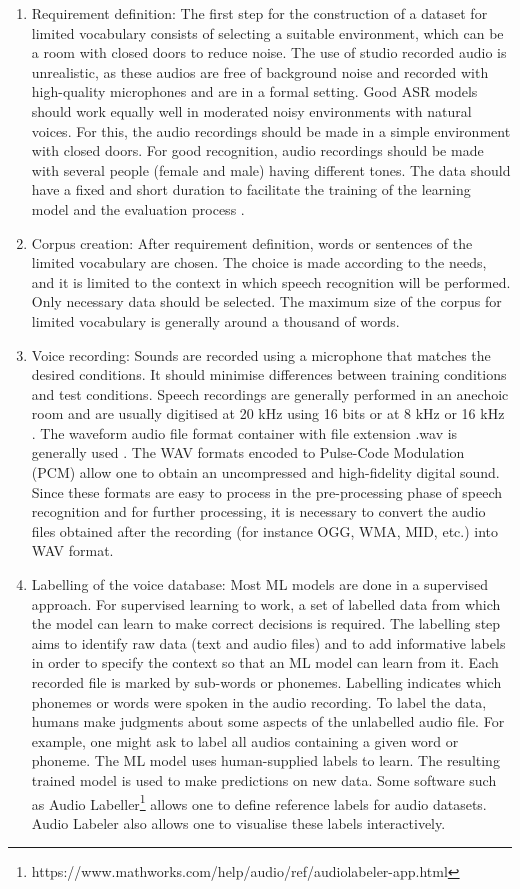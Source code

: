 \begin{enumerate}[label=\alph*.)]
  \item Requirement definition:
The first step for the construction of a dataset for limited vocabulary consists of selecting a suitable environment, which can be a room with closed doors to reduce noise. The use of studio recorded audio is unrealistic, as these audios are free of background noise and recorded with high-quality microphones and are in a formal setting. Good ASR models should work equally well in moderated noisy environments with natural voices. For this, the audio recordings should be made in a simple environment with closed doors.
	For good recognition, audio recordings should be made with several people (female and male) having different tones. The data should have a fixed and short duration to facilitate the training of the learning model and the evaluation process .
\item Corpus creation: 
After requirement definition, words or sentences of the limited vocabulary are chosen. The choice is made according to the needs, and it is limited to the context in which speech recognition will be performed. Only necessary data should be selected. The maximum size of the corpus for limited vocabulary is generally around a thousand of words.
\item Voice recording:
Sounds are recorded using a microphone that matches the desired conditions. It should minimise differences between training conditions and test conditions. Speech recordings are generally performed in an anechoic room and are usually digitised at 20 kHz using 16 bits  or at 8 kHz  or 16 kHz . The waveform audio file format container with file extension .wav is generally used . The WAV formats encoded to Pulse-Code Modulation (PCM) allow one to obtain an uncompressed and high-fidelity digital sound. Since these formats are easy to process in the pre-processing phase of speech recognition and for further processing, it is necessary to convert the audio files obtained after the recording (for instance OGG, WMA, MID, etc.) into WAV format.
\item 	Labelling of the voice database:
Most ML models are done in a supervised approach. For supervised learning to work, a set of labelled data from which the model can learn to make correct decisions is required. The labelling step aims to identify raw data (text and audio files) and to add informative labels in order to specify the context so that an ML  model can learn from it. Each recorded file is marked by sub-words or phonemes. Labelling indicates which phonemes or words were spoken in the audio recording. To label the data, humans make judgments about some aspects of the unlabelled audio file. For example, one might ask to label all audios containing a given word or phoneme.
	The ML model uses human-supplied labels to learn. The resulting trained model is used to make predictions on new data. Some software such as Audio Labeller\footnote{https://www.mathworks.com/help/audio/ref/audiolabeler-app.html}  allows one to define reference labels for audio datasets. Audio Labeler also allows one to visualise these labels interactively.
\end{enumerate}
